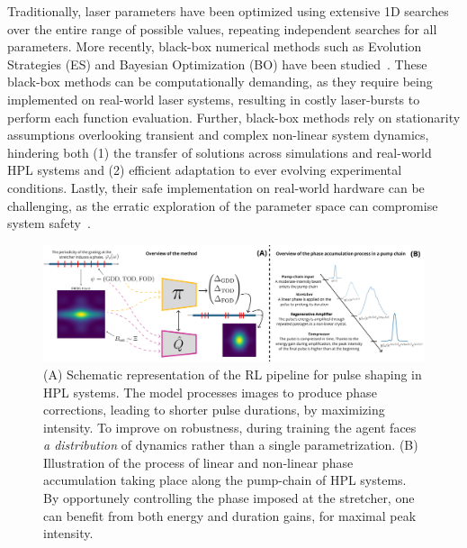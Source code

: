 Traditionally, laser parameters have been optimized using extensive 1D searches over the entire range of possible values, repeating independent searches for all parameters. 
More recently, black-box numerical methods such as Evolution Strategies (ES) and Bayesian Optimization (BO) have been studied~\citep{loughran2023automated, shalloo2020automation, capuano2022laser, arteaga2014supercontinuum}. 
These black-box methods can be computationally demanding, as they require being implemented on real-world laser systems, resulting in costly laser-bursts to perform each function evaluation. 
Further, black-box methods rely on stationarity assumptions overlooking transient and complex non-linear system dynamics, hindering both (1) the transfer of solutions across simulations and real-world HPL systems and (2) efficient adaptation to ever evolving experimental conditions.
Lastly, their safe implementation on real-world hardware can be challenging, as the erratic exploration of the parameter space can compromise system safety~\citep{capuano2023temporl}.

\begin{figure}
    \centering
    \includegraphics[width=\linewidth]{images/Figure1_and_CPA.png}
    \caption{(A) Schematic representation of the RL pipeline for pulse shaping in HPL systems. The model processes images to produce phase corrections, leading to shorter pulse durations, by maximizing intensity. To improve on robustness, during training the agent faces \textit{a distribution} of dynamics rather than a single parametrization. (B) Illustration of the process of linear and non-linear phase accumulation taking place along the pump-chain of HPL systems. By opportunely controlling the phase imposed at the stretcher, one can benefit from both energy and duration gains, for maximal peak intensity.}
    \label{fig:figure1_and_cpa}
\end{figure}


